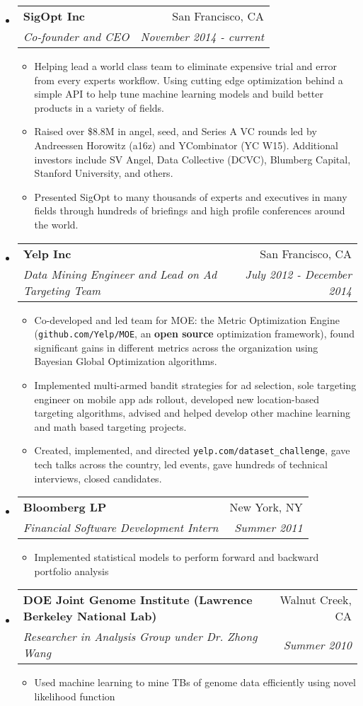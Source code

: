 \documentclass[letterpaper,11pt]{article}
\makeatletter
\newcommand{\resitem}[1]{\item #1 \vspace{-2pt}}
\newcommand{\ressubheading}[4]{
\begin{tabular*}{6.5in}{l@{\cftdotfill{\cftsecdotsep}\extracolsep{\fill}}r}
		\textbf{#1} & #2 \\
		\textit{#3} & \textit{#4} \\
\end{tabular*}\vspace{-6pt}}
\makeatother
\begin{document}
\begin{itemize}

\item
	\ressubheading{SigOpt Inc}{San Francisco, CA}{Co-founder and CEO}{November 2014 - current}
	\begin{itemize}
      \resitem{Helping lead a world class team to eliminate expensive trial and error from every experts workflow. Using cutting edge optimization behind a simple API to help tune machine learning models and build better products in a variety of fields.}
      \resitem{Raised over \$8.8M in angel, seed, and Series A VC rounds led by Andreessen Horowitz (a16z) and YCombinator (YC W15). Additional investors include SV Angel, Data Collective (DCVC), Blumberg Capital, Stanford University, and others.}
      \resitem{Presented SigOpt to many thousands of experts and executives in many fields through hundreds of briefings and high profile conferences around the world.}
	\end{itemize}

\item
	\ressubheading{Yelp Inc}{San Francisco, CA}{Data Mining Engineer and Lead on Ad Targeting Team}{July 2012 - December 2014}
	\begin{itemize}
            \resitem{Co-developed and led team for MOE: the Metric Optimization Engine (\texttt{github.com/Yelp/MOE}, an \textbf{open source} optimization framework), found significant gains in different metrics across the organization using Bayesian Global Optimization algorithms.}
            \resitem{Implemented multi-armed bandit strategies for ad selection, sole targeting engineer on mobile app ads rollout, developed new location-based targeting algorithms, advised and helped develop other machine learning and math based targeting projects.}
            \resitem{Created, implemented, and directed \texttt{yelp.com/dataset\_challenge}, gave tech talks across the country, led events, gave hundreds of technical interviews, closed candidates.}
	\end{itemize}

\item
	\ressubheading{Bloomberg LP}{New York, NY}{Financial Software Development Intern}{Summer 2011}
	\begin{itemize}
    \resitem{Implemented statistical models to perform forward and backward portfolio analysis}
	\end{itemize}

\item
	\ressubheading{DOE Joint Genome Institute (Lawrence Berkeley National Lab)}{Walnut Creek, CA}{Researcher in Analysis Group under Dr. Zhong Wang}{Summer 2010}
	\begin{itemize}
    \resitem{Used machine learning to mine TBs of genome data efficiently using novel likelihood function}
	\end{itemize}


\end{itemize}
\end{document}
